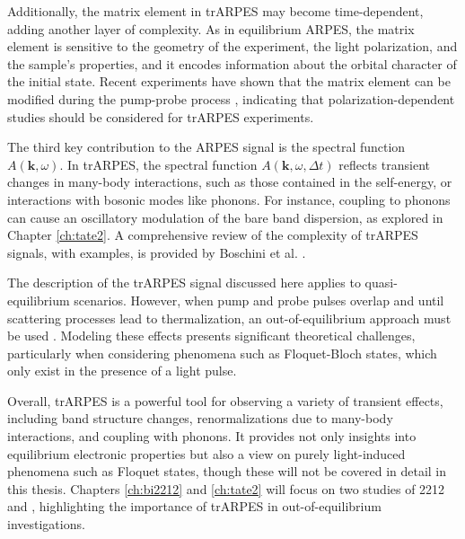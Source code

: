 Additionally, the matrix element in trARPES may become time-dependent, adding another layer of complexity.
As in equilibrium ARPES, the matrix element is sensitive to the geometry of the experiment, the light polarization, and the sample's properties, and it encodes information about the orbital character of the initial state.
Recent experiments have shown that the matrix element can be modified during the pump-probe process \cite{boschini_role_2020,freericks_constant_2016}, indicating that polarization-dependent studies should be considered for trARPES experiments.

The third key contribution to the ARPES signal is the spectral function $A(\mathbf{k}, \omega)$.
In trARPES, the spectral function $A(\mathbf{k}, \omega, \Delta t)$ reflects transient changes in many-body interactions, such as those contained in the self-energy, or interactions with bosonic modes like phonons.
For instance, coupling to phonons can cause an oscillatory modulation of the bare band dispersion, as explored in Chapter \ref{ch:tate2}.
A comprehensive review of the complexity of trARPES signals, with examples, is provided by Boschini et al. \cite{boschini_time-resolved_2024}.

The description of the trARPES signal discussed here applies to quasi-equilibrium scenarios.
However, when pump and probe pulses overlap and until scattering processes lead to thermalization, an out-of-equilibrium approach must be used \cite{schuler_theory_2021, freericks_what_2021, neufeld_time-_2022}.
Modeling these effects presents significant theoretical challenges, particularly when considering phenomena such as Floquet-Bloch states, which only exist in the presence of a light pulse.

Overall, trARPES is a powerful tool for observing a variety of transient effects, including band structure changes, renormalizations due to many-body interactions, and coupling with phonons.
It provides not only insights into equilibrium electronic properties but also a view on purely light-induced phenomena such as Floquet states, though these will not be covered in detail in this thesis.
Chapters \ref{ch:bi2212} and \ref{ch:tate2} will focus on two studies of 2212 and , highlighting the importance of trARPES in out-of-equilibrium investigations.